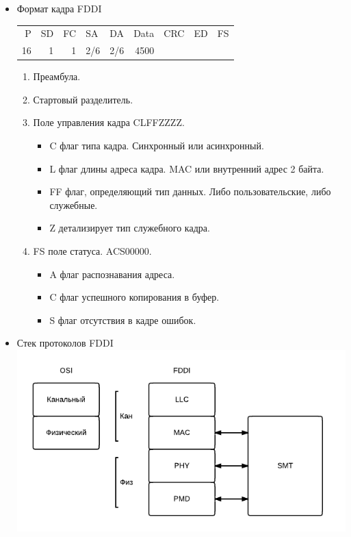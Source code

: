 \documentclass[12pt, russian, oneside, article]{ncc}
\begin{document}
\begin{itemize}
\item Формат кадра FDDI\\
\label{sec-5_2_2_3}%
\begin{center}
\begin{tabular}{rrrllrlll}
  P  &  SD  &  FC  &  SA   &  DA   &  Data  &  CRC  &  ED  &  FS  \\
 16  &   1  &   1  &  2/6  &  2/6  &  4500  &       &      &      \\
\end{tabular}
\end{center}



\begin{enumerate}
\item Преамбула.
\item Стартовый разделитель.
\item Поле управления кадра CLFFZZZZ.

\begin{itemize}
\item C флаг типа кадра. Синхронный или асинхронный.
\item L флаг длины адреса кадра. MAC или внутренний адрес 2 байта.
\item FF флаг, определяющий тип данных. Либо пользовательские, либо служебные.
\item Z детализирует тип служебного кадра.
\end{itemize}

\item FS поле статуса. ACS00000.

\begin{itemize}
\item A флаг распознавания адреса.
\item C флаг успешного копирования в буфер.
\item S флаг отсутствия в кадре ошибок.
\end{itemize}

\end{enumerate}


\item Стек протоколов FDDI\\
\label{sec-5_2_2_4}%
\includegraphics[]{images/SiSPI/ffdi.png}


\end{itemize}
\end{document}
